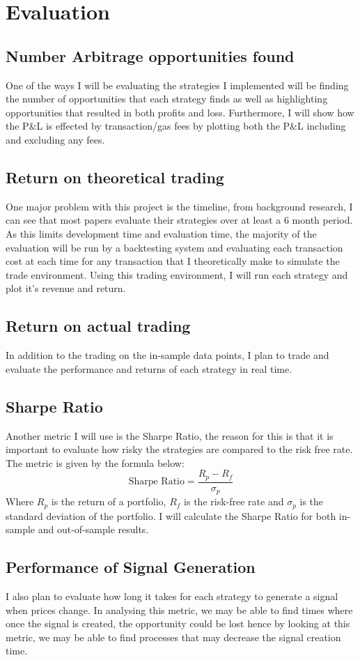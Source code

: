\chapter{Evaluation}

\section{Number Arbitrage opportunities found}
One of the ways I will be evaluating the strategies I implemented will be finding the number of opportunities that each strategy finds as well as highlighting opportunities that resulted in both profits and loss. Furthermore, I will show how the P\&L is effected by transaction/gas fees by plotting both the P\&L including and excluding any fees.

\section{Return on theoretical trading}
One major problem with this project is the timeline, from background research, I can see that most papers evaluate their strategies over at least a 6 month period. As this limits development time and evaluation time, the majority of the evaluation will be run by a backtesting system and evaluating each transaction cost at each time for any transaction that I theoretically make to simulate the trade environment. Using this trading environment, I will run each strategy and plot it's revenue and return.

\section{Return on actual trading}

In addition to the trading on the in-sample data points, I plan to trade and evaluate the performance and returns of each strategy in real time.

\section{Sharpe Ratio}

Another metric I will use is the Sharpe Ratio, the reason for this is that it is important to evaluate how risky the strategies are compared to the risk free rate. The metric is given by the formula below:$$\text{Sharpe Ratio} = \frac{R_p - R_f}{\sigma_p}$$ Where $R_p$ is the return of a portfolio, $R_f$ is the risk-free rate and $\sigma_p$ is the standard deviation of the portfolio. I will calculate the Sharpe Ratio for both in-sample and out-of-sample results. 

\section{Performance of Signal Generation}

I also plan to evaluate how long it takes for each strategy to generate a signal when prices change. In analysing this metric, we may be able to find times where once the signal is created, the opportunity could be lost hence by looking at this metric, we may be able to find processes that may decrease the signal creation time.

